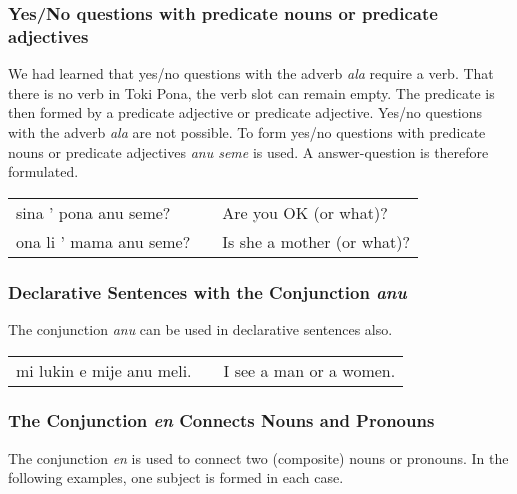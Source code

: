 \subsubsection*{Yes/No questions with predicate nouns or predicate adjectives}
We had learned that yes/no questions with the adverb \textit{ala} require a verb.
That there is no verb in Toki Pona, the verb slot can remain empty.
The predicate is then formed by a predicate adjective or predicate adjective.
Yes/no questions with the adverb \textit{ala} are not possible.
To form yes/no questions with predicate nouns or predicate adjectives \textit{anu seme} is used.
A answer-question is therefore formulated.

\begin{supertabular}{p{5,5cm}|ll}
    sina ' pona anu seme?   &  & Are you OK (or what)?      \\
    ona li ' mama anu seme? &  & Is she a mother (or what)? \\
\end{supertabular}

\subsubsection*{Declarative Sentences with the Conjunction \textit{anu}}

The conjunction \textit{anu} can be used in declarative sentences also.

\begin{supertabular}{p{5,5cm}|ll}
    mi lukin e mije anu meli. &  & I see a man or a women. \\
\end{supertabular}

\subsubsection*{The Conjunction \textit{en} Connects Nouns and Pronouns}
The conjunction \textit{en} is used to connect two (composite) nouns or pronouns.
In the following examples, one subject is formed in each case.

